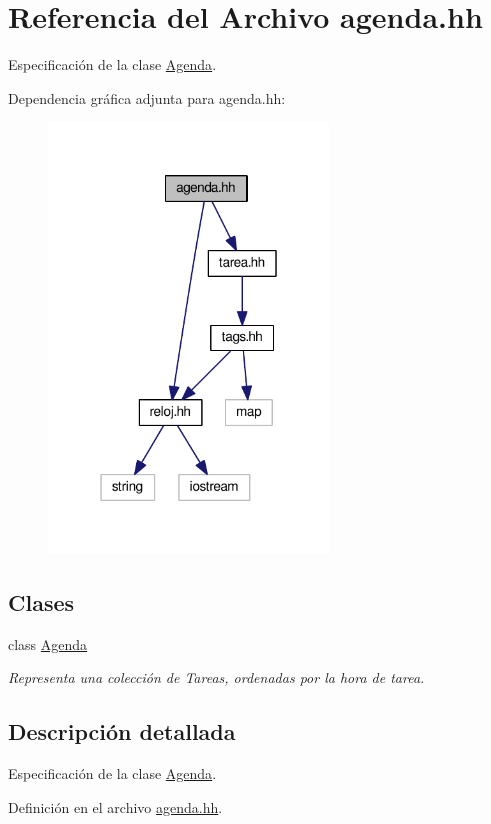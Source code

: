\hypertarget{agenda_8hh}{\section{Referencia del Archivo agenda.\-hh}
\label{agenda_8hh}
}


Especificación de la clase \hyperlink{class_agenda}{Agenda}.  


Dependencia gráfica adjunta para agenda.\-hh\-:\nopagebreak
\begin{figure}[H]
\begin{center}
\leavevmode
\includegraphics[width=211pt]{agenda_8hh__incl}
\end{center}
\end{figure}
\subsection*{Clases}
\begin{DoxyCompactItemize}
\item 
class \hyperlink{class_agenda}{Agenda}
\begin{DoxyCompactList}\small\item\em Representa una colección de Tareas, ordenadas por la hora de tarea. \end{DoxyCompactList}\end{DoxyCompactItemize}


\subsection{Descripción detallada}
Especificación de la clase \hyperlink{class_agenda}{Agenda}. 

Definición en el archivo \hyperlink{agenda_8hh_source}{agenda.\-hh}.


